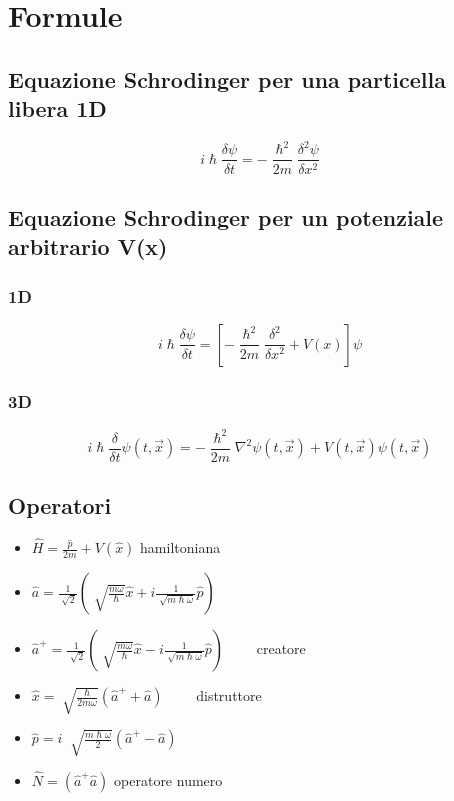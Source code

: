 \chapter{Formule}

\section{Equazione Schrodinger per una particella libera 1D}
\begin{equation*}
    i\hslash \frac{\delta \psi}{\delta t} = -\frac{\hslash^2}{2m}\frac{\delta^2 \psi}{\delta x^2}
\end{equation*}

\section{Equazione Schrodinger per un potenziale arbitrario V(x)}
\subsection{1D}
\begin{equation*}
    i\hslash \frac{\delta \psi}{\delta t } = \left[-\frac{\hslash^2}{2m}\frac{\delta^2}{\delta x^2} + V(x)\right]\psi
\end{equation*}
\subsection{3D}
\begin{equation*}
    i\hslash \frac{\delta}{\delta t} \psi(t,\vec{x}) = -\frac{\hslash^2}{2m} \nabla^2 \psi(t,\vec{x}) + V(t,\vec{x})\psi(t,\vec{x})
\end{equation*}

\section{Operatori}
\begin{itemize}
    \item $\hat{H} = \frac{\hat{p}}{2m} + V(\hat{x})$ \qquad hamiltoniana
    \item $\hat{a} = \frac{1}{\sqrt[]{2}}\left(\sqrt[]{\frac{m\omega}{\hslash}}\hat{x}+ i \frac{1}{\sqrt[]{m\hslash\omega}}\hat{p}\right)$
    \item $\hat{a}^+ = \frac{1}{\sqrt[]{2}}\left(\sqrt[]{\frac{m\omega}{\hslash}}\hat{x} - i \frac{1}{\sqrt[]{m\hslash\omega}}\hat{p}\right)\qquad$  creatore 
    \item $\hat{x} = \sqrt[]{\frac{\hslash}{2m\omega}}(\hat{a}^+ + \hat{a}) \qquad$ distruttore
    \item $\hat{p} = i \; \sqrt[]{\frac{m\hslash\omega}{2}}(\hat{a}^+ - \hat{a})$ 
    \item $\hat{N} = (\hat{a}^+\hat{a})$ \qquad operatore numero
\end{itemize}
